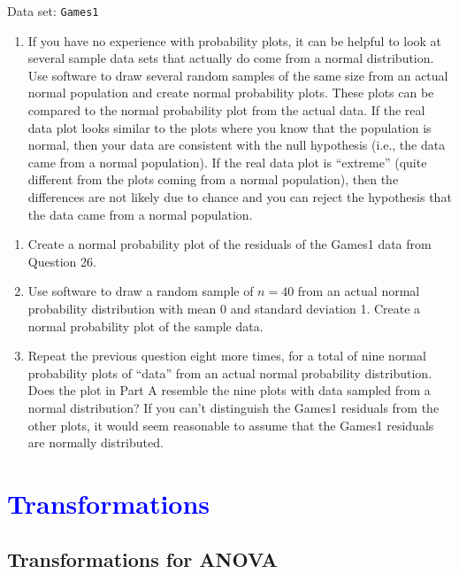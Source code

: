 \documentclass[
]{report}
\providecommand{\tightlist}{%
  \setlength{\itemsep}{0pt}\setlength{\parskip}{0pt}}
\begin{document}
\vspace{-1em}

Data set: \texttt{Games1}

\begin{enumerate}
\def\labelenumi{\arabic{enumi}.}
\setcounter{enumi}{29}
\tightlist
\item
  If you have no experience with probability plots, it can be helpful to look at several sample data sets that actually do come from a normal distribution. Use software to draw several random samples of the same size from an actual normal population and create normal probability plots. These plots can be compared to the normal probability plot from the actual data. If the real data plot looks similar to the plots where you know that the population is normal, then your data are consistent with the null hypothesis (i.e., the data came from a normal population). If the real data plot is ``extreme'' (quite different from the plots coming from a normal population), then the differences are not likely due to chance and you can reject the hypothesis that the data came from a normal population.
\end{enumerate}

\begin{enumerate}
\def\labelenumi{(\alph{enumi})}
\item
  Create a normal probability plot of the residuals of the Games1 data from Question 26.
\item
  Use software to draw a random sample of \(\scriptstyle n = 40\) from an actual normal probability distribution with mean 0 and standard deviation 1. Create a normal probability plot of the sample data.
\item
  Repeat the previous question eight more times, for a total of nine normal probability plots of ``data'' from an actual normal probability distribution. Does the plot in Part A resemble the nine plots with data sampled from a normal distribution? If you can't distinguish the Games1 residuals from the other plots, it would seem reasonable to assume that the Games1 residuals are normally distributed.
\end{enumerate}

\hypertarget{section-22}{%
\section{\texorpdfstring{\textcolor{blue}{ Transformations}}{}}\label{section-22}}

\hypertarget{transformations-for-anova}{%
\subsection*{Transformations for ANOVA}\label{transformations-for-anova}}
\end{document}

